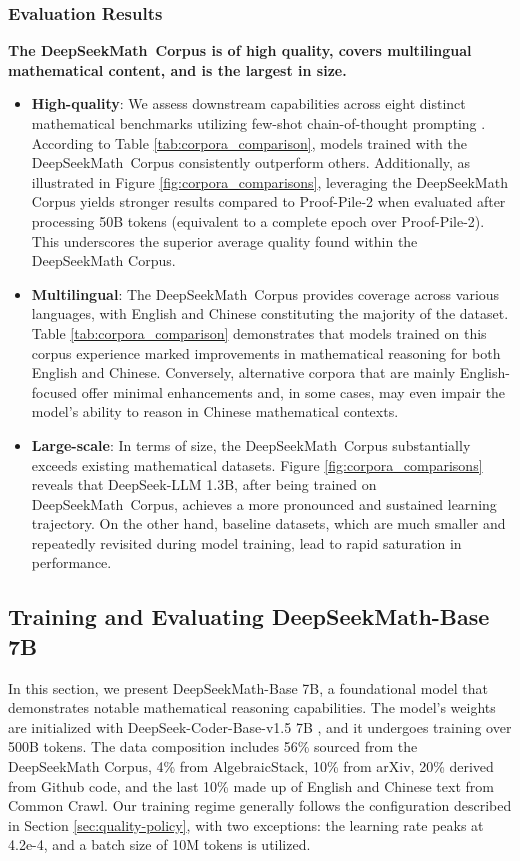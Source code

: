 \begin{itemize}[topsep=0pt]
\subsubsection{Evaluation Results}

\textbf{The DeepSeekMath~Corpus is of high quality, covers multilingual mathematical content, and is the largest in size.}

\begin{itemize}[topsep=0pt]
    \item \textbf{High-quality}: 
    We assess downstream capabilities across eight distinct mathematical benchmarks utilizing few-shot chain-of-thought prompting \cite{cot}. According to Table \ref{tab:corpora_comparison}, models trained with the DeepSeekMath~Corpus consistently outperform others. Additionally, as illustrated in Figure \ref{fig:corpora_comparisons}, leveraging the DeepSeekMath Corpus yields stronger results compared to Proof-Pile-2 when evaluated after processing 50B tokens (equivalent to a complete epoch over Proof-Pile-2). This underscores the superior average quality found within the DeepSeekMath Corpus.
    \item \textbf{Multilingual}:
    The DeepSeekMath~Corpus provides coverage across various languages, with English and Chinese constituting the majority of the dataset. Table \ref{tab:corpora_comparison} demonstrates that models trained on this corpus experience marked improvements in mathematical reasoning for both English and Chinese. Conversely, alternative corpora that are mainly English-focused offer minimal enhancements and, in some cases, may even impair the model's ability to reason in Chinese mathematical contexts.
    \item \textbf{Large-scale}:
    In terms of size, the DeepSeekMath~Corpus substantially exceeds existing mathematical datasets. Figure \ref{fig:corpora_comparisons} reveals that DeepSeek-LLM 1.3B, after being trained on DeepSeekMath~Corpus, achieves a more pronounced and sustained learning trajectory. On the other hand, baseline datasets, which are much smaller and repeatedly revisited during model training, lead to rapid saturation in performance.
\end{itemize}

\subsection{Training and Evaluating DeepSeekMath-Base 7B}

In this section, we present DeepSeekMath-Base 7B, a foundational model that demonstrates notable mathematical reasoning capabilities. The model’s weights are initialized with DeepSeek-Coder-Base-v1.5 7B \citep{deepseek-coder}, and it undergoes training over 500B tokens. The data composition includes 56\% sourced from the DeepSeekMath Corpus, 4\% from AlgebraicStack, 10\% from arXiv, 20\% derived from Github code, and the last 10\% made up of English and Chinese text from Common Crawl. Our training regime generally follows the configuration described in Section \ref{sec:quality-policy}, with two exceptions: the learning rate peaks at 4.2e-4, and a batch size of 10M tokens is utilized.


\end{itemize}
